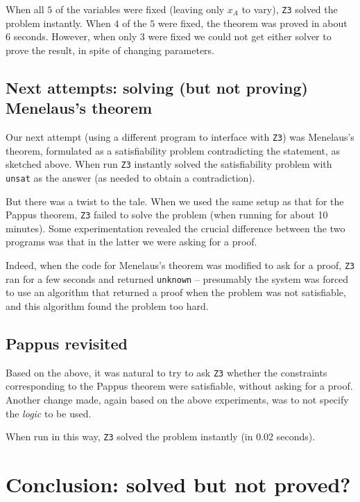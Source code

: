 \documentclass{amsart}
\theoremstyle{plain}
\theoremstyle{definition}
\theoremstyle{remark}
\begin{document}
When all \(5\) of the variables were fixed (leaving only \(x_A\) to
vary), \texttt{Z3} solved the problem instantly. When \(4\) of the \(5\) were
fixed, the theorem was proved in about 6 seconds. However, when only
\(3\) were fixed we could not get either solver to prove the result, in
spite of changing parameters.

\subsection{Next attempts: solving (but not proving) Menelaus's theorem}

Our next attempt (using a different program to interface with \texttt{Z3}) was Menelaus's theorem,
formulated as a satisfiability problem contradicting the
statement, as sketched above. When run \texttt{Z3} instantly solved the satisfiability problem
with \texttt{unsat} as the answer (as needed to obtain a contradiction).

But there was a twist to the tale. When we used the same setup as that for the Pappus theorem,
\texttt{Z3} failed to solve the problem (when running for about 10
minutes). Some experimentation revealed the crucial difference between
the two programs was that in the latter we were asking for a proof.

Indeed, when the code for Menelaus's theorem was modified to ask for a
proof, \texttt{Z3} ran for a few seconds and returned \texttt{unknown} --
presumably the system was forced to use an algorithm that returned a
proof when the problem was not satisfiable, and this algorithm found the
problem too hard.

\subsection{Pappus revisited}

Based on the above, it was natural to try to ask \texttt{Z3} whether the
constraints corresponding to the Pappus theorem were satisfiable,
without asking for a proof. Another change made, again based on the
above experiments, was to not specify the \emph{logic} to be used.

When run in this way, \texttt{Z3} solved the problem instantly (in 0.02 seconds).



\section{Conclusion: solved but not proved?}
\end{document}
